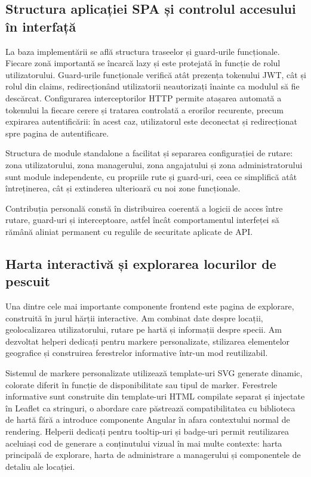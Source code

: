 \subsection{Structura aplicației SPA și controlul accesului în interfață}

La baza implementării se află structura traseelor și guard-urile funcționale. Fiecare zonă importantă se încarcă lazy și este protejată în funcție de rolul utilizatorului. Guard-urile funcționale verifică atât prezența tokenului JWT, cât și rolul din claims, redirecționând utilizatorii neautorizați înainte ca modulul să fie descărcat. Configurarea interceptorilor HTTP permite atașarea automată a tokenului la fiecare cerere și tratarea controlată a erorilor recurente, precum expirarea autentificării: în acest caz, utilizatorul este deconectat și redirecționat spre pagina de autentificare.

Structura de module standalone a facilitat și separarea configurației de rutare: zona utilizatorului, zona managerului, zona angajatului și zona administratorului sunt module independente, cu propriile rute și guard-uri, ceea ce simplifică atât întreținerea, cât și extinderea ulterioară cu noi zone funcționale.

Contribuția personală constă în distribuirea coerentă a logicii de acces între rutare, guard-uri și interceptoare, astfel încât comportamentul interfeței să rămână aliniat permanent cu regulile de securitate aplicate de API.

\subsection{Harta interactivă și explorarea locurilor de pescuit}

Una dintre cele mai importante componente frontend este pagina de explorare, construită în jurul hărții interactive. Am combinat date despre locații, geolocalizarea utilizatorului, rutare pe hartă și informații despre specii. Am dezvoltat helperi dedicați pentru markere personalizate, stilizarea elementelor geografice și construirea ferestrelor informative într-un mod reutilizabil.

Sistemul de markere personalizate utilizează template-uri SVG generate dinamic, colorate diferit în funcție de disponibilitate sau tipul de marker. Ferestrele informative sunt construite din template-uri HTML compilate separat și injectate în Leaflet ca stringuri, o abordare care păstrează compatibilitatea cu biblioteca de hartă fără a introduce componente Angular în afara contextului normal de rendering. Helperii dedicați pentru tooltip-uri și badge-uri permit reutilizarea aceluiași cod de generare a conținutului vizual în mai multe contexte: harta principală de explorare, harta de administrare a managerului și componentele de detaliu ale locației.

